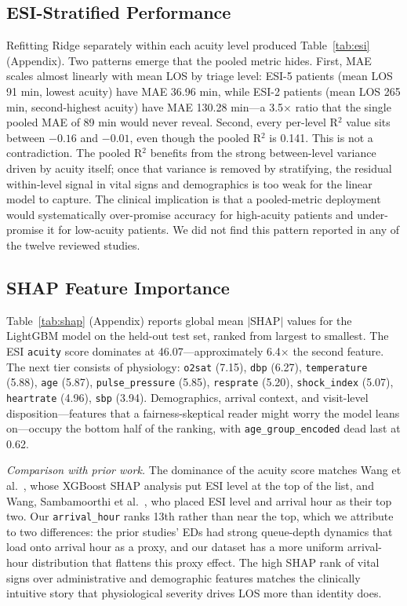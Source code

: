 \documentclass[conference]{IEEEtran}
\begin{document}
\subsection{ESI-Stratified Performance}
Refitting Ridge separately within each acuity level produced
Table~\ref{tab:esi} (Appendix). Two patterns emerge that the pooled metric
hides. First, MAE scales almost linearly with mean LOS by triage level:
ESI-5 patients (mean LOS 91 min, lowest acuity) have MAE 36.96 min, while
ESI-2 patients (mean LOS 265 min, second-highest acuity) have MAE 130.28
min---a 3.5$\times$ ratio that the single pooled MAE of 89 min would never
reveal. Second, every per-level R$^2$ value sits between $-0.16$ and $-0.01$,
even though the pooled R$^2$ is 0.141. This is not a contradiction. The
pooled R$^2$ benefits from the strong between-level variance driven by
acuity itself; once that variance is removed by stratifying, the residual
within-level signal in vital signs and demographics is too weak for the
linear model to capture. The clinical implication is that a pooled-metric
deployment would systematically over-promise accuracy for high-acuity
patients and under-promise it for low-acuity patients. We did not find this
pattern reported in any of the twelve reviewed studies.

\subsection{SHAP Feature Importance}
Table~\ref{tab:shap} (Appendix) reports global mean $|$SHAP$|$ values for
the LightGBM model on the held-out test set, ranked from largest to
smallest. The ESI \texttt{acuity} score dominates at 46.07---approximately
6.4$\times$ the second feature. The next tier consists of physiology:
\texttt{o2sat} (7.15), \texttt{dbp} (6.27), \texttt{temperature} (5.88),
\texttt{age} (5.87), \texttt{pulse\_pressure} (5.85), \texttt{resprate}
(5.20), \texttt{shock\_index} (5.07), \texttt{heartrate} (4.96),
\texttt{sbp} (3.94). Demographics, arrival context, and visit-level
disposition---features that a fairness-skeptical reader might worry the
model leans on---occupy the bottom half of the ranking, with
\texttt{age\_group\_encoded} dead last at 0.62.

\textit{Comparison with prior work.} The dominance of the acuity score
matches Wang et al.~\cite{wang2025fair}, whose XGBoost SHAP analysis put ESI
level at the top of the list, and Wang, Sambamoorthi
et al.~\cite{wang2025interp}, who placed ESI level and arrival hour as
their top two. Our \texttt{arrival\_hour} ranks 13th rather than near the
top, which we attribute to two differences: the prior studies' EDs had
strong queue-depth dynamics that load onto arrival hour as a proxy, and our
dataset has a more uniform arrival-hour distribution that flattens this
proxy effect. The high SHAP rank of vital signs over administrative and
demographic features matches the clinically intuitive story that
physiological severity drives LOS more than identity does.
\end{document}
